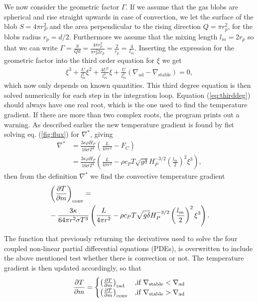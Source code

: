\documentclass{emulateapj}
\begin{document}
	We now consider the geometric factor $\Gamma$. If we assume that the gas blobs are spherical and rise straight upwards in case of convection, we let the surface of the blob $S = 4\pi r_P^2$ and the area perpendicular to the rising direction $Q = \pi r_p^2$, for the blobs radius $r_p = d/2$. Furthermore we assume that the mixing length $l_m = 2r_p$ so that we can write $\Gamma = \frac{S}{Qd} = \frac{4\pi r_p^2}{\pi r_p^2 2r_p} = \frac{2}{r_p} = \frac{4}{l_m}$. Inserting the expression for the geometric factor into the third order equation for $\xi$ we get
	\begin{align}
		\xi^3 + \frac{U}{l_m^2}\xi^2 + \frac{4U^2}{l_m^4}\xi + \frac{U}{l_m^2}(\nabla_\text{ad} - \nabla_\text{stable}) = 0,
		\label{eq:thirddeg}
	\end{align}
	which now only depends on known quantities. This third degree equation is then solved numerically for each step in the integration loop. Equation (\ref{eq:thirddeg}) should always have one real root, which is the one used to find the temperature gradient. If there are more than two complex roots, the program prints out a warning.
	As described earlier the new temperature gradient is found by fist solving eq. (\ref{fig:flux}) for $\nabla^*$, giving 
	\begin{align}
		\nabla^* &= \frac{3\kappa\rho H_P}{16\sigma T^4}\left(\frac{L}{4\pi r^2} - F_C\right)\\
		&= \frac{3\kappa\rho H_P}{16\sigma T^4}\left(\frac{L}{4\pi r^2} - \rho c_P T\sqrt{g\delta} H_P^{-3/2}\left(\frac{l_m}{2}\right)^2\xi^{3}\right),
	\end{align}
	then from the definition $\nabla^* $ we find the convective temperature gradient
	\begin{align}
		&\left(\pdv{T}{m}\right)_\text{conv} =\nonumber\\
		&- \frac{3\kappa}{64\pi r^2\sigma T^3 }\left(\frac{L}{4\pi r^2} - \rho c_P T\sqrt{g\delta} H_P^{-3/2}\left(\frac{l_m}{2}\right)^2\xi^{3}\right)\nonumber.
	\end{align}
	
	The function that previously returning the derivatives used to solve the four coupled non-linear partial differential equations (PDEs), is overwritten to include the above mentioned test whether there is convection or not. The temperature gradient is then updated accordingly, so that 
	\begin{align}
		\pdv{T}{m} =
		\begin{cases}
			\left(\pdv{T}{m}\right)_\text{rad}&\text{,if } \nabla_\text{stable}<\nabla_\text{ad}\\
			\left(\pdv{T}{m}\right)_\text{conv}&\text{,if } \nabla_\text{stable}>\nabla_\text{ad}
		\end{cases}
	\end{align}
	
\end{document}
